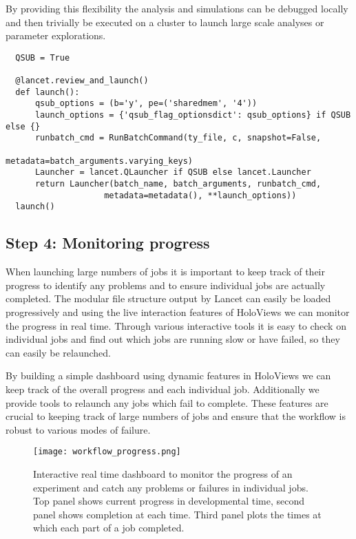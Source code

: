 By providing this flexibility the analysis and simulations can be
debugged locally and then trivially be executed on a cluster to launch
large scale analyses or parameter explorations.

\begin{minipage}{\linewidth}
\begin{lstlisting}
  QSUB = True

  @lancet.review_and_launch()
  def launch():
      qsub_options = (b='y', pe=('sharedmem', '4'))
      launch_options = {'qsub_flag_optionsdict': qsub_options} if QSUB else {}
      runbatch_cmd = RunBatchCommand(ty_file, c, snapshot=False,
                                     metadata=batch_arguments.varying_keys)
      Launcher = lancet.QLauncher if QSUB else lancet.Launcher
      return Launcher(batch_name, batch_arguments, runbatch_cmd,
                    metadata=metadata(), **launch_options))
  launch()
\end{lstlisting}
\end{minipage}

\subsection{Step 4: Monitoring progress}

When launching large numbers of jobs it is important to keep track of
their progress to identify any problems and to ensure individual jobs
are actually completed. The modular file structure output by Lancet
can easily be loaded progressively and using the live interaction
features of HoloViews we can monitor the progress in real
time. Through various interactive tools it is easy to check on
individual jobs and find out which jobs are running slow or have
failed, so they can easily be relaunched.

By building a simple dashboard using dynamic features in HoloViews we
can keep track of the overall progress and each individual job.
Additionally we provide tools to relaunch any jobs which fail to
complete. These features are crucial to keeping track of large numbers
of jobs and ensure that the workflow is robust to various modes of
failure.

\begin{figure}
	\centering
        \texttt{[image: workflow\_progress.png]}
	    \caption[Interactive dashboard to monitor workflow
          progress.]{Interactive real time dashboard to monitor the
          progress of an experiment and catch any problems or failures
          in individual jobs. Top panel shows current progress in
          developmental time, second panel shows completion at each
          time. Third panel plots the times at which each part of a
          job completed.}
	\label{workflow_progress}
\end{figure}


